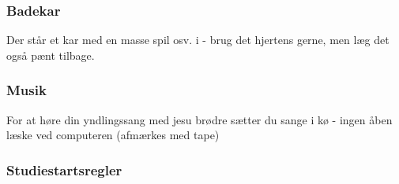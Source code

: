 \documentclass[../../../main.tex]{subfiles}
\begin{document}
\subsubsection{Badekar}
Der står et kar med en masse spil osv. i - brug det hjertens gerne, men læg det også pænt tilbage.


\subsubsection{Musik}
For at høre din yndlingssang med jesu brødre sætter du sange i kø - ingen åben læske ved computeren (afmærkes med tape)


\subsubsection{Studiestartsregler}
\end{document}

